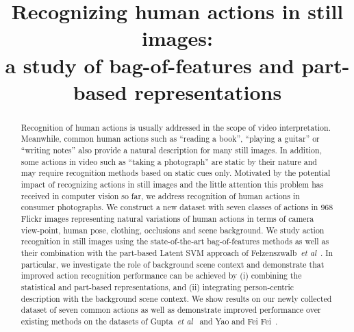 \documentclass{bmvc2k}
\title{Recognizing human actions in still images: \\ a study of bag-of-features and part-based representations}
\def\etal{\emph{et al}\bmvaOneDot}
\begin{document}
\maketitle

\begin{abstract}
Recognition of human actions is usually addressed in the scope of video
interpretation.
Meanwhile, common human actions such as ``reading a book'', ``playing a guitar''
or ``writing notes'' also provide a natural description for many still images.
In addition, some actions in video such as ``taking a photograph'' are static by their
nature and may require recognition methods based on static cues only.
Motivated by the potential impact of recognizing actions in still images
and the little attention this problem has received in computer vision
so far, we address recognition of human actions in
consumer photographs.
We construct a new dataset with seven classes of actions in 968 Flickr images
representing natural variations
of human actions in terms of camera view-point, human pose, clothing, occlusions and scene background.
We study action recognition in still images using the state-of-the-art bag-of-features methods as well
as their combination with the part-based Latent SVM approach of Felzenszwalb~\etal~\cite{Felzenszwalb09}.
In particular, we investigate the role of background scene context and demonstrate
that improved action recognition performance can be achieved by
 (i) combining the statistical and part-based representations,
 and (ii) integrating person-centric description with the background scene context. 
We show results on our newly collected dataset of seven common actions
as well as  demonstrate improved performance over existing methods on the datasets of Gupta~\etal~\cite{Gupta09}
and Yao and Fei Fei~\cite{FeiFei10a}.
%

\end{abstract}
\end{document}
